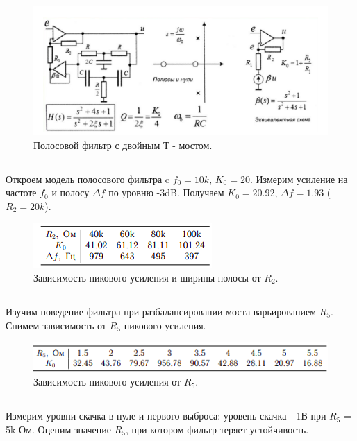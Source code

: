 \documentclass[15pt,a5paper,reqno]{article}
\begin{document}
\begin{figure}[h!]
    \centering
    \includegraphics[width=1\linewidth]{pics/pic5.png} 
    \caption{Полосовой фильтр с двойным Т - мостом.}
\end{figure}

\subsection{}

 Откроем модель полосового фильтра c $f_0 = 10k$, $K_0 = 20$. Измерим
усиление на частоте $f_0$ и полосу $\Delta f$ по уровню -3dB. Получаем $K_0 = 20.92$,
$\Delta f = 1.93$ ($R_2 = 20k$).

\begin{figure}[h!]
    \centering
    \includegraphics[width=0.4\linewidth]{pics/pic6.png}
    \caption{Зависимость пикового усиления и ширины полосы от $R_2$.}
\end{figure}

\subsection{}

Изучим поведение фильтра при разбалансировании моста варьированием $R_5$. Снимем зависимость от $R_5$ пикового усиления.
\begin{figure}[h!]
    \centering
    \includegraphics[width=0.8\linewidth]{pics/pic7.png}
    \caption*{Зависимость пикового усиления от $R_5$.}
\end{figure}
\subsection{}
Измерим уровни скачка в нуле и первого выброса: уровень скачка - 1В при $R_5$ =
5k Ом.
Оценим значение $R_5$, при котором фильтр теряет устойчивость.
\end{document}

